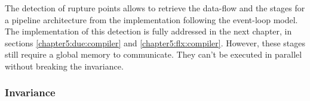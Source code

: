 
The detection of rupture points allows to retrieve the data-flow and the stages for a pipeline architecture from the implementation following the event-loop model.
The implementation of this detection is fully addressed in the next chapter, in sections \ref{chapter5:due:compiler} and \ref{chapter5:flx:compiler}.
However, these stages still require a global memory to communicate.
They can't be executed in parallel without breaking the invariance.





\subsubsection{Invariance}


